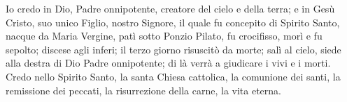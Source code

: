 Io credo in Dio, Padre onnipotente, creatore del cielo e della terra;
e in Gesù Cristo, suo unico Figlio, nostro Signore,
il quale fu concepito di Spirito Santo, nacque da Maria Vergine,
patì sotto Ponzio Pilato, fu crocifisso, morì e fu sepolto;
discese agli inferi; il terzo giorno risuscitò da morte;
salì al cielo, siede alla destra di Dio Padre onnipotente;
di là verrà a giudicare i vivi e i morti.
Credo nello Spirito Santo,
la santa Chiesa cattolica, la comunione dei santi,
la remissione dei peccati,
la risurrezione della carne,
la vita eterna.
\amen
